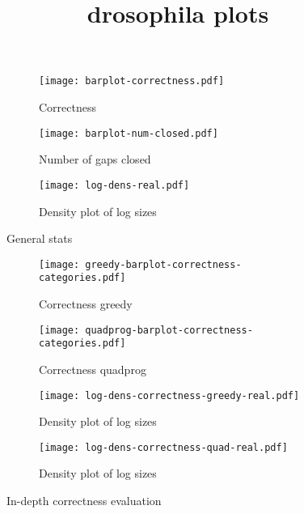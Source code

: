 \documentclass[12pt]{amsart}
\begin{document}
\title{drosophila plots}

\maketitle

\newpage
\begin{figure}[h!]
  \centering

    \begin{subfigure}{230pt}
    \centering
      \texttt{[image: barplot-correctness.pdf]}
      \caption{Correctness}
    \end{subfigure}%
    \begin{subfigure}{230pt}
      \texttt{[image: barplot-num-closed.pdf]}
      \caption{Number of gaps closed}
    \end{subfigure}

    \begin{subfigure}{400pt}
      \texttt{[image: log-dens-real.pdf]}
      \caption{Density plot of log sizes}
    \end{subfigure}    

  \caption{General stats}
\end{figure}

\begin{figure}[h!]
  \centering

    \begin{subfigure}{230pt}
    \centering
      \texttt{[image: greedy-barplot-correctness-categories.pdf]}
      \caption{Correctness greedy}
    \end{subfigure}%
    \begin{subfigure}{230pt}
      \texttt{[image: quadprog-barplot-correctness-categories.pdf]}
      \caption{Correctness quadprog}
    \end{subfigure}

    \begin{subfigure}{230pt}
      \texttt{[image: log-dens-correctness-greedy-real.pdf]}
      \caption{Density plot of log sizes}
    \end{subfigure}%
    \begin{subfigure}{230pt}
      \texttt{[image: log-dens-correctness-quad-real.pdf]}
      \caption{Density plot of log sizes}
    \end{subfigure}    

  \caption{In-depth correctness evaluation}
\end{figure}
\end{document}
